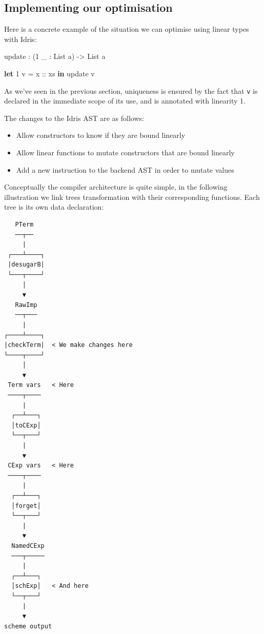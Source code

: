 \documentclass[
]{article}
\newenvironment{Shaded}{}{}
\newcommand{\DataTypeTok}[1]{\textcolor[rgb]{0.56,0.13,0.00}{#1}}
\newcommand{\DecValTok}[1]{\textcolor[rgb]{0.25,0.63,0.44}{#1}}
\newcommand{\KeywordTok}[1]{\textcolor[rgb]{0.00,0.44,0.13}{\textbf{#1}}}
\newcommand{\NormalTok}[1]{#1}
\newcommand{\OperatorTok}[1]{\textcolor[rgb]{0.40,0.40,0.40}{#1}}
\newcommand{\OtherTok}[1]{\textcolor[rgb]{0.00,0.44,0.13}{#1}}
\providecommand{\tightlist}{%
  \setlength{\itemsep}{0pt}\setlength{\parskip}{0pt}}
\begin{document}
\hypertarget{implementing-our-optimisation}{%
\subsection{Implementing our
optimisation}\label{implementing-our-optimisation}}

Here is a concrete example of the situation we can optimise using linear
types with Idris:

\begin{Shaded}
\begin{Highlighting}[]
\NormalTok{update }\OperatorTok{:}\NormalTok{ (}\DecValTok{1}\NormalTok{ \_ }\OperatorTok{:} \DataTypeTok{List}\NormalTok{ a) }\OtherTok{{-}\textgreater{}} \DataTypeTok{List}\NormalTok{ a}

\KeywordTok{let} \DecValTok{1}\NormalTok{ v }\OtherTok{= x ::}\NormalTok{ xs }\KeywordTok{in}
\NormalTok{    update v}
\end{Highlighting}
\end{Shaded}

As we've seen in the previous section, uniqueness is ensured by the fact
that \texttt{v} is declared in the immediate scope of its use, and is
annotated with linearity 1.

The changes to the Idris AST are as follows:

\begin{itemize}
\tightlist
\item
  Allow constructors to know if they are bound linearly
\item
  Allow linear functions to mutate constructors that are bound linearly
\item
  Add a new instruction to the backend AST in order to mutate values
\end{itemize}

Conceptually the compiler architecture is quite simple, in the following
illustration we link trees transformation with their corresponding
functions. Each tree is its own data declaration:

\newpage

\begin{verbatim}
   PTerm
   ──┬──
     |
 ┌───┴────┐
 |desugarB|
 └───┬────┘
     │
     ▼
   RawImp
   ──┬───
     |
┌────┴────┐
|checkTerm|  < We make changes here
└────┬────┘
     │
     ▼
 Term vars   < Here
 ────┬────
     |
  ┌──┴───┐
  │toCExp│
  └──┬───┘
     |
     ▼
 CExp vars   < Here
 ────┬────
     |
  ┌──┴───┐
  │forget│
  └──┬───┘
     |
     ▼
  NamedCExp
  ───┬─────
     |
  ┌──┴───┐
  │schExp│   < And here
  └──┬───┘
     |
     ▼
scheme output
\end{verbatim}
\end{document}
